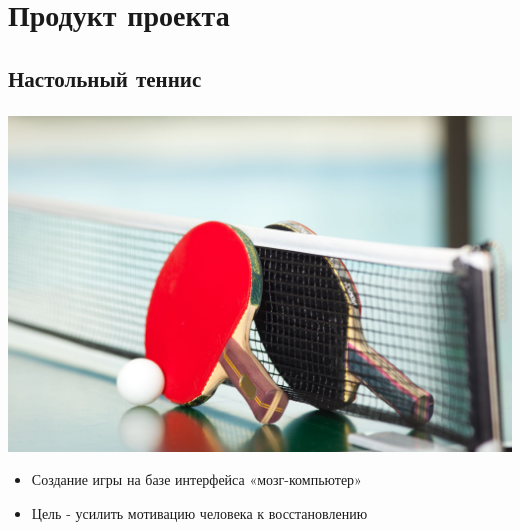 \section{Продукт проекта}

%
%
%


\subsection{Настольный теннис}

\begin{frame}
\frametitle{\insertsection} 
\framesubtitle{\insertsubsection}
\begin{minipage}[h]{0.4\linewidth}
    \includegraphics[width=\linewidth]{3.jpg}
\end{minipage}
\hfill 
\begin{minipage}[h]{0.5\linewidth}
    \begin{itemize}
        \item Создание игры на базе интерфейса «мозг-компьютер» 
        \item Цель - усилить мотивацию человека к восстановлению 
    \end{itemize}
\end{minipage}
\end{frame}